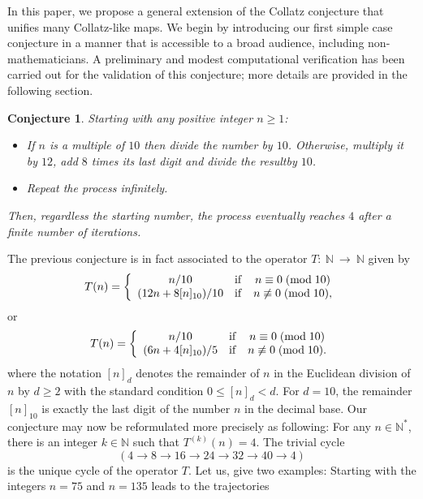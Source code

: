 \documentclass[11pt,a4paper]{article}
\newtheorem{conjecture}{Conjecture}[section]
\newcommand*\modd[3]{#1\equiv#2\;( {\rm mod}\;  #3)}
\newcommand*\notmodd[3]{#1\not\equiv#2\;( {\rm mod}\;  #3)}
\begin{document}
 

In this paper, we propose a general  extension of the Collatz conjecture that unifies many Collatz-like maps. We begin by introducing our first simple case conjecture in a manner that is accessible to a broad audience, including non-mathematicians.
A preliminary and modest computational verification has been carried out for the validation of this conjecture; more details are provided in the following section.

\begin{conjecture}\label{Myconjecture}
	Starting with any positive integer  $n\geq 1$:
	\begin{itemize}
		\item[$\bullet$]  If $n$  is a multiple of $10$  then divide the number by $10$.  Otherwise, 
		multiply it by $12$, add  $8$ times  its  last digit and divide the resultby $10$.
		\item Repeat the process infinitely.
	\end{itemize}
	Then,  regardless the starting number, the process eventually reaches $4$  after a finite number of iterations.
\end{conjecture}
The previous conjecture is in fact associated to the operator
$T:~\mathbb{N}~\longrightarrow~\mathbb{N}$ given by
\begin{equation}\label{mapT0}
	T(n)=\left\{\begin{array}{ccc}
		n/10&\mathrm{if}& \modd{n}{0}{10}\\
		(12 n+8 [ n]_{10})/10&\mathrm{if}& \notmodd{n}{0}{10},\\
	\end{array}\right.\end{equation}
or
\begin{equation}\label{mapT01}
	T(n)=\left\{\begin{array}{ccc}
		n/10&\mathrm{if}& \modd{n}{0}{10}\\
		(6 n+4 [ n]_{10})/5
		&\mathrm{if}& \notmodd{n}{0}{10}.\\
	\end{array}\right.
\end{equation}
where the notation $[n]_d$ denotes the remainder of $n$ in the Euclidean division of $n$ by $d\geq 2$ with the standard condition   $0\leq [n]_d<d$. For $d=10$, the remainder $[n]_{10}$ is exactly  the last digit of the number $n$ in the decimal base.  Our conjecture may now be reformulated more precisely as following:  For any $n\in\mathbb{N}^*$, there is an integer $k\in\mathbb{N}$ such that  $T^{(k)}(n)=4$.  The trivial cycle $$(4\rightarrow  8\rightarrow 16\rightarrow  24\rightarrow 32\rightarrow  40\rightarrow 4)$$ is  the unique cycle of the operator $T$. Let us, give two  examples: Starting with the integers $n=75$ and $n=135$ leads to the trajectories
\end{document}
